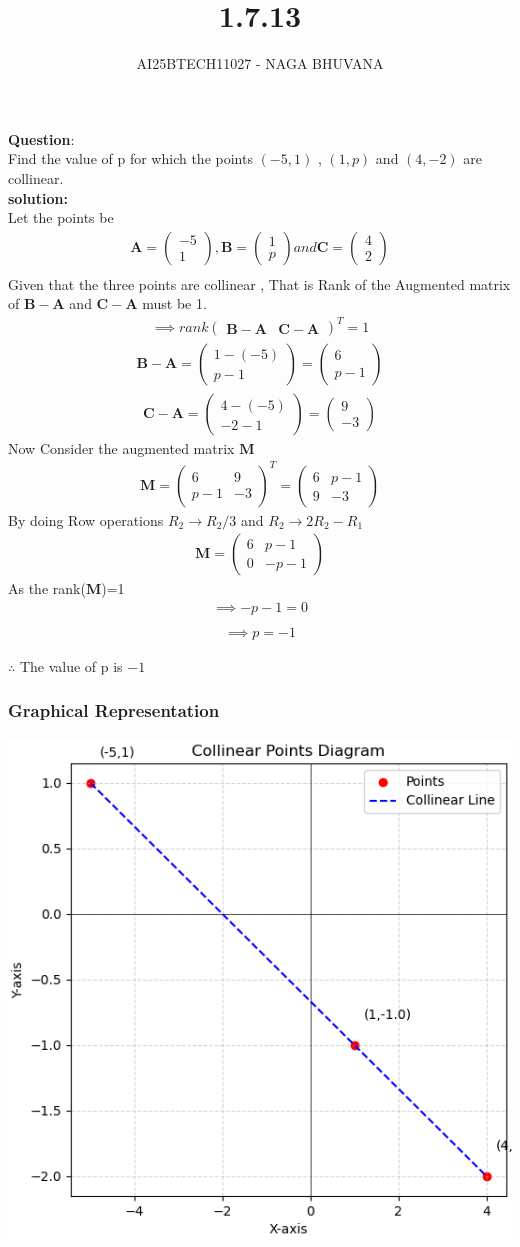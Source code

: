 \documentclass{beamer}
\title{1.7.13}
\author{AI25BTECH11027 - NAGA BHUVANA}
\providecommand{\brak}[1]{\ensuremath{\left(#1\right)}}
\theoremstyle{remark}
\newcommand{\myvec}[1]{\ensuremath{\begin{pmatrix}#1\end{pmatrix}}}
\let\vec\mathbf
\numberwithin{equation}{section}
\begin{document}
{\let\newpage\relax\maketitle}
\renewcommand{\thefigure}{\theenumi}
\renewcommand{\thetable}{\theenumi}
\textbf{Question}:\\
\noindent Find the value of p for which the points $\brak{-5,1}$ , \brak{1,p} and $\brak{4,-2}$ are collinear.\\
\textbf{solution:}\\
Let the points be
\begin{align}
\vec{A}=\myvec{-5\\1} , \vec{B}=\myvec{1\\p} and \vec{C}=\myvec{4\\2}\\
\end{align}
Given that the three points are collinear ,
That is Rank of the Augmented matrix of $\vec{B-A}$ and $\vec{C-A}$ must be 1.
\begin{align}
 \implies   rank\myvec{\vec{B-A} & \vec{C-A}}^T=1
\end{align}
\begin{align}
    \vec{B-A}=\myvec{1-(-5)\\p-1}=\myvec{6\\p-1}
\end{align}
\begin{align}
    \vec{C-A}=\myvec{4-(-5)\\-2-1}=\myvec{9\\-3}
\end{align}
Now Consider the augmented matrix $\vec{M}$\\
\begin{align}
    \vec{M}=\myvec{6 & 9 \\ p-1 & -3}^T=\myvec{6 & p-1 \\ 9 & -3}
\end{align}
By doing Row operations $R_2 \longrightarrow R_2/3$ and  $R_2 \longrightarrow 2R_2-R_1$\\
\begin{align}
    \vec{M}=\myvec{6 & p-1\\0 & -p-1}
\end{align}
As the rank($\vec{M}$)=1\\
\begin{align}
    \implies -p-1=0\\
\end{align}
\begin{align}
  \implies  \boxed{p=-1}
\end{align}
\begin{center}
$\therefore$ The value of p is $-1$
\end{center}
	\frametitle{Graphical Representation}
	\centering
	\includegraphics[width=0.6\linewidth]{figs/fig1.png}
\end{document}
